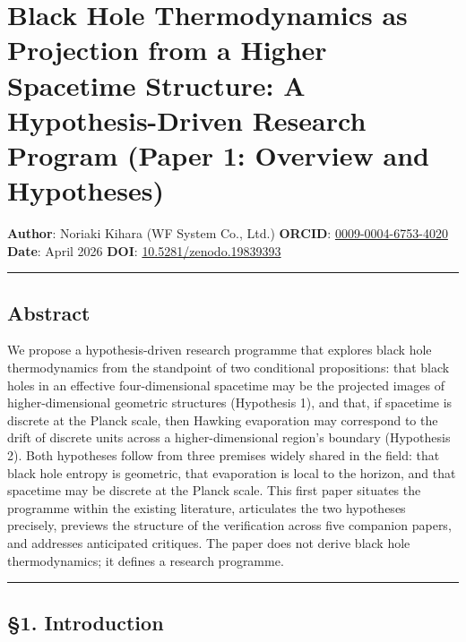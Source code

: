 \documentclass[a4paper,11pt]{article}
\theoremstyle{definition}
\begin{document}
\section{Black Hole Thermodynamics as Projection from a Higher Spacetime
Structure: A Hypothesis-Driven Research Program (Paper 1: Overview and
Hypotheses)}\label{black-hole-thermodynamics-as-projection-from-a-higher-spacetime-structure-a-hypothesis-driven-research-program-paper-1-overview-and-hypotheses}

\textbf{Author}: Noriaki Kihara (WF System Co., Ltd.) \textbf{ORCID}:
\href{https://orcid.org/0009-0004-6753-4020}{0009-0004-6753-4020}
\textbf{Date}: April 2026 \textbf{DOI}:
\href{https://doi.org/10.5281/zenodo.19839393}{10.5281/zenodo.19839393}

\begin{center}\rule{0.5\linewidth}{0.5pt}\end{center}

\subsection{Abstract}\label{abstract}

We propose a hypothesis-driven research programme that explores black
hole thermodynamics from the standpoint of two conditional propositions:
that black holes in an effective four-dimensional spacetime may be the
projected images of higher-dimensional geometric structures (Hypothesis
1), and that, if spacetime is discrete at the Planck scale, then Hawking
evaporation may correspond to the drift of discrete units across a
higher-dimensional region's boundary (Hypothesis 2). Both hypotheses
follow from three premises widely shared in the field: that black hole
entropy is geometric, that evaporation is local to the horizon, and that
spacetime may be discrete at the Planck scale. This first paper situates
the programme within the existing literature, articulates the two
hypotheses precisely, previews the structure of the verification across
five companion papers, and addresses anticipated critiques. The paper
does not derive black hole thermodynamics; it defines a research
programme.

\begin{center}\rule{0.5\linewidth}{0.5pt}\end{center}

\subsection{§1. Introduction}\label{introduction}
\end{document}
